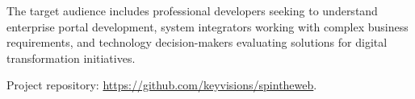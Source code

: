 The target audience includes professional developers seeking to understand enterprise portal development, system integrators working with complex business requirements, and technology decision-makers evaluating solutions for digital transformation initiatives.

Project repository: \url{https://github.com/keyvisions/spintheweb}.

\clearpage
